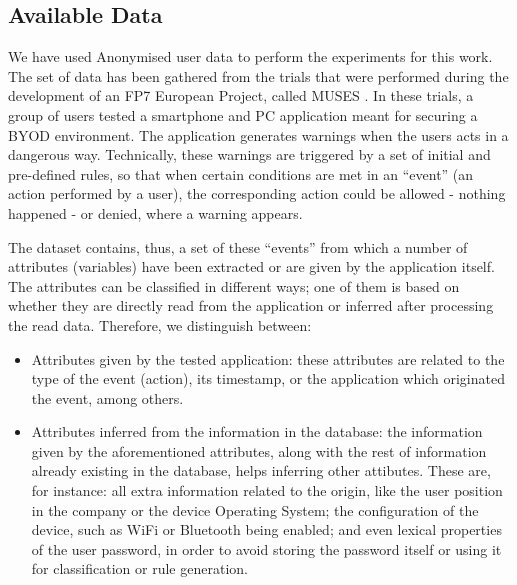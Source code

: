 \documentclass[a4paper,10pt,twocolumn,preprint,3p]{elsarticle}
\begin{document}
\subsection{Available Data}
\label{subsec:data}

We have used Anonymised user data to perform the experiments for this
work. %
 The set of data has been gathered from the trials that were performed
 during the development of an FP7 European Project, called MUSES
 \cite{DBLP:conf/sac/MoraCGZJEBAH14}. In these trials, a group of
 users tested a smartphone and PC application meant for securing a
 BYOD environment. The application generates warnings when the users
 acts in a dangerous way. Technically, these warnings are triggered by
 a set of initial and pre-defined rules, so that when certain
 conditions are met in an ``event'' (an action performed by a user),
 the corresponding action could be allowed - nothing happened - or
 denied, where a warning appears. %

The dataset contains, thus, a set of these ``events'' from which a number of attributes (variables) have been extracted or are given by the application itself. The attributes can be classified in different ways; one of them is based on whether they are directly read from the application or inferred after processing the read data. Therefore, we distinguish between:
\begin{itemize}
  \item Attributes given by the tested application: these attributes
    are related to the type of the event (action), its timestamp, or
    the application which originated the event, among others. 
  \item Attributes inferred from the information in the database: the information given by the aforementioned attributes, along with the rest of information already existing in the database, helps inferring other attibutes.
       These are, for instance: all extra information related to the origin, like the user position in the company or the device Operating System; the configuration of the device, such as WiFi or Bluetooth being enabled; and even lexical properties of the user password, in order to avoid storing the password itself or using it for classification or rule generation.
\end{itemize}
\end{document}
